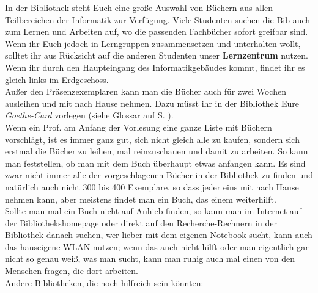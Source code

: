 In der Bibliothek steht Euch eine große Auswahl von Büchern aus allen Teilbereichen der Informatik zur Verfügung. Viele Studenten suchen die Bib auch zum Lernen und Arbeiten auf, wo die passenden Fachbücher sofort greifbar sind. Wenn ihr Euch jedoch in Lerngruppen zusammensetzen und unterhalten wollt, solltet ihr aus Rücksicht auf die anderen Studenten unser \textbf{Lernzentrum} nutzen. Wenn ihr durch den Haupteingang des Informatikgebäudes kommt, findet ihr es gleich links im Erdgeschoss.\\

Außer den Präsenzexemplaren kann man die Bücher auch für zwei Wochen ausleihen und mit nach Hause nehmen. Dazu müsst ihr in der Bibliothek Eure \textit{Goethe-Card} vorlegen (siehe Glossar auf S. \pageref{glossar}).\\

Wenn ein Prof. am Anfang der Vorlesung eine ganze Liste mit Büchern vorschlägt, ist es immer ganz gut, sich nicht gleich alle zu kaufen, sondern sich erstmal die Bücher zu leihen, mal reinzuschauen und damit zu arbeiten. So kann man feststellen, ob man mit dem Buch überhaupt etwas anfangen kann. Es sind zwar nicht immer alle der vorgeschlagenen Bücher in der Bibliothek zu finden und natürlich auch nicht 300 bis 400 Exemplare, so dass jeder eins mit nach Hause nehmen kann, aber meistens findet man ein Buch, das einem weiterhilft.\\

Sollte man mal ein Buch nicht auf Anhieb finden, so kann man im Internet auf der Bibliothekshomepage oder direkt auf den Recherche-Rechnern in der Bibliothek danach suchen, wer lieber mit dem eigenen Notebook sucht, kann auch das hauseigene WLAN nutzen; wenn das auch nicht hilft oder man eigentlich gar nicht so genau weiß, was man sucht, kann man ruhig auch mal einen von den Menschen fragen, die dort arbeiten.\\

Andere Bibliotheken, die noch hilfreich sein könnten:


